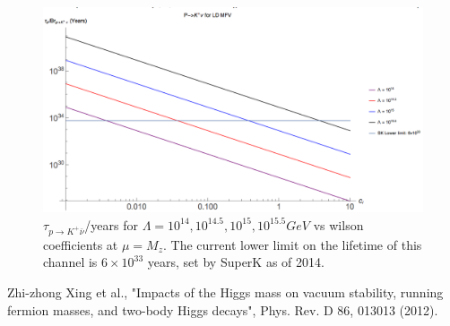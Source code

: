 \documentclass[aps,onecolumn,twoside,secnumarabic,balancelastpage,amsmath,amssymb,nofootinbib,hyperref=pdftex]{revtex4}
\begin{document}
\begin{figure}[htbp]
\begin{center}
\includegraphics[width=12cm]{wilsons.png}
\caption{$\tau_{p\rightarrow K^{+}\bar{\nu}}$/years for $\Lambda = 10^{14},10^{14.5},10^{15},10^{15.5} GeV$ vs wilson coefficients at $\mu = M_{z}$. The current lower limit on the lifetime of this channel is $6\times 10^{33}$ years, set by SuperK as of 2014.}
\label{default}
\end{center}
\end{figure}

\begin{thebibliography}{9}

Zhi-zhong Xing et al., "Impacts of the Higgs mass on vacuum stability, running fermion masses, and two-body Higgs decays", Phys. Rev. D 86, 013013 (2012).

\end{thebibliography}
\end{document}
